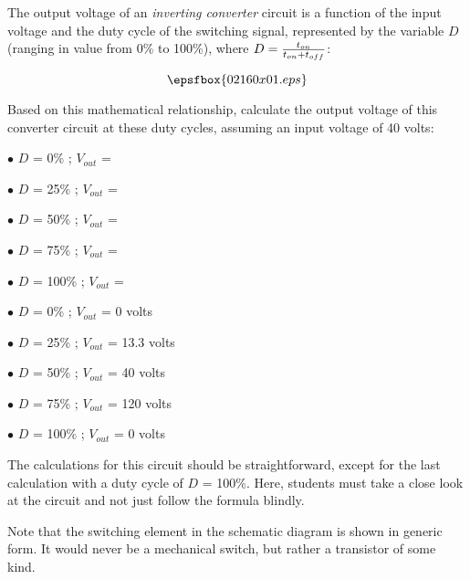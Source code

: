 

The output voltage of an {\it inverting converter} circuit is a function of the input voltage and the duty cycle of the switching signal, represented by the variable $D$ (ranging in value from 0\% to 100\%), where $D = {{t_{on}} \over {t_{on} + t_{off}}}$:


$$\epsfbox{02160x01.eps}$$

Based on this mathematical relationship, calculate the output voltage of this converter circuit at these duty cycles, assuming an input voltage of 40 volts:

\medskip
\goodbreak
\item{$\bullet$} $D$ = 0\% ; $V_{out}$ = 
\item{$\bullet$} $D$ = 25\% ; $V_{out}$ =
\item{$\bullet$} $D$ = 50\% ; $V_{out}$ =
\item{$\bullet$} $D$ = 75\% ; $V_{out}$ =
\item{$\bullet$} $D$ = 100\% ; $V_{out}$ =
\medskip







\medskip
\goodbreak
\item{$\bullet$} $D$ = 0\% ; $V_{out}$ = 0 volts
\item{$\bullet$} $D$ = 25\% ; $V_{out}$ = 13.3 volts
\item{$\bullet$} $D$ = 50\% ; $V_{out}$ = 40 volts
\item{$\bullet$} $D$ = 75\% ; $V_{out}$ = 120 volts
\item{$\bullet$} $D$ = 100\% ; $V_{out}$ = 0 volts
\medskip







The calculations for this circuit should be straightforward, except for the last calculation with a duty cycle of $D$ = 100\%.  Here, students must take a close look at the circuit and not just follow the formula blindly.  

Note that the switching element in the schematic diagram is shown in generic form.  It would never be a mechanical switch, but rather a transistor of some kind.




